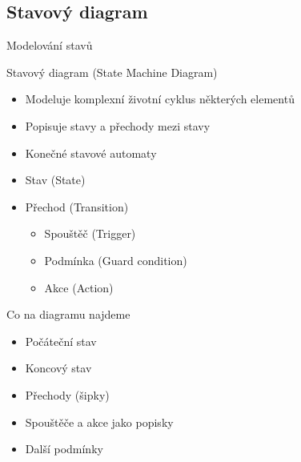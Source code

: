\subsection{Stavový diagram}



\begin{frame}{Modelování stavů}

Stavový diagram (State Machine Diagram)

\begin{itemize}
	\item Modeluje komplexní životní cyklus některých elementů
	\item Popisuje stavy a přechody mezi stavy
	\item Konečné stavové automaty
	\item Stav (State)
	\item Přechod (Transition)
	\begin{itemize}
		\item Spouštěč (Trigger)
		\item Podmínka (Guard condition)
		\item Akce (Action)
	\end{itemize}
\end{itemize}

Co na diagramu najdeme

\begin{itemize}
	\item Počáteční stav
	\item Koncový stav
	\item Přechody (šipky)
	\item Spouštěče a akce jako popisky
	\item Další podmínky
\end{itemize}

\end{frame}


